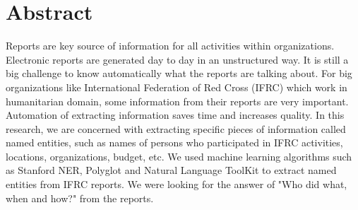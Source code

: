 \chapter*{Abstract} 
Reports are key source of information for all activities within  organizations. Electronic reports are generated day to day in an 
unstructured way.
It is still a big challenge to know automatically what the reports are talking about.
For big organizations like International Federation of Red Cross (IFRC) which work
in humanitarian domain, some information from their reports are very important.
Automation of extracting information saves time and
increases quality. In this research, we are concerned with extracting specific pieces of information called named entities, such as names of persons who participated in IFRC activities, locations, organizations, budget, etc.
We used machine learning algorithms such as
Stanford NER, Polyglot and Natural Language ToolKit
to extract named entities from IFRC reports.
We were looking for the answer of "Who did what, when and how?" from the reports.


